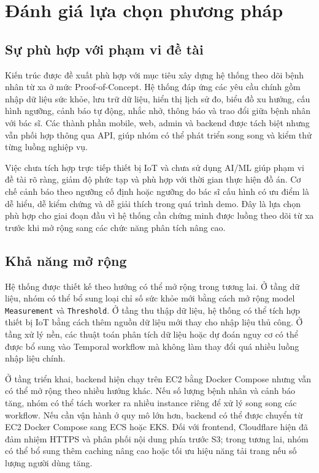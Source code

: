 \section{Đánh giá lựa chọn phương pháp}

\subsection{Sự phù hợp với phạm vi đề tài}
\par Kiến trúc được đề xuất phù hợp với mục tiêu xây dựng hệ thống theo dõi bệnh nhân từ xa ở mức Proof-of-Concept. Hệ thống đáp ứng các yêu cầu chính gồm nhập dữ liệu sức khỏe, lưu trữ dữ liệu, hiển thị lịch sử đo, biểu đồ xu hướng, cấu hình ngưỡng, cảnh báo tự động, nhắc nhở, thông báo và trao đổi giữa bệnh nhân với bác sĩ. Các thành phần mobile, web, admin và backend được tách biệt nhưng vẫn phối hợp thông qua API, giúp nhóm có thể phát triển song song và kiểm thử từng luồng nghiệp vụ.

\par Việc chưa tích hợp trực tiếp thiết bị IoT và chưa sử dụng AI/ML giúp phạm vi đề tài rõ ràng, giảm độ phức tạp và phù hợp với thời gian thực hiện đồ án. Cơ chế cảnh báo theo ngưỡng cố định hoặc ngưỡng do bác sĩ cấu hình có ưu điểm là dễ hiểu, dễ kiểm chứng và dễ giải thích trong quá trình demo. Đây là lựa chọn phù hợp cho giai đoạn đầu vì hệ thống cần chứng minh được luồng theo dõi từ xa trước khi mở rộng sang các chức năng phân tích nâng cao.

\subsection{Khả năng mở rộng}
\par Hệ thống được thiết kế theo hướng có thể mở rộng trong tương lai. Ở tầng dữ liệu, nhóm có thể bổ sung loại chỉ số sức khỏe mới bằng cách mở rộng model \texttt{Measurement} và \texttt{Threshold}. Ở tầng thu thập dữ liệu, hệ thống có thể tích hợp thiết bị IoT bằng cách thêm nguồn dữ liệu mới thay cho nhập liệu thủ công. Ở tầng xử lý nền, các thuật toán phân tích dữ liệu hoặc dự đoán nguy cơ có thể được bổ sung vào Temporal workflow mà không làm thay đổi quá nhiều luồng nhập liệu chính.

\par Ở tầng triển khai, backend hiện chạy trên EC2 bằng Docker Compose nhưng vẫn có thể mở rộng theo nhiều hướng khác. Nếu số lượng bệnh nhân và cảnh báo tăng, nhóm có thể tách worker ra nhiều instance riêng để xử lý song song các workflow. Nếu cần vận hành ở quy mô lớn hơn, backend có thể được chuyển từ EC2 Docker Compose sang ECS hoặc EKS. Đối với frontend, Cloudflare hiện đã đảm nhiệm HTTPS và phân phối nội dung phía trước S3; trong tương lai, nhóm có thể bổ sung thêm caching nâng cao hoặc tối ưu hiệu năng tải trang nếu số lượng người dùng tăng.

